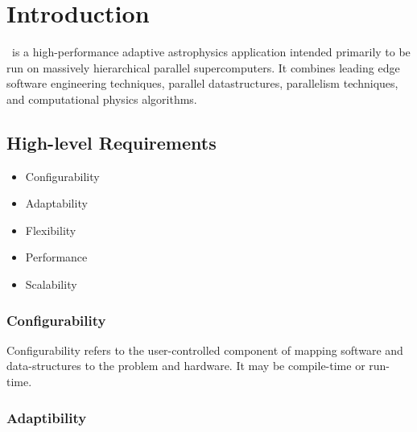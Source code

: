 \documentclass{article}
\begin{document}

\section{Introduction} \label{s:intro}

   \cello\ is a high-performance adaptive astrophysics application
   intended primarily to be run on massively hierarchical parallel
   supercomputers.  It combines leading edge software engineering
   techniques, parallel datastructures, parallelism techniques, and
   computational physics algorithms.

\subsection{High-level Requirements}

\begin{itemize}
\item Configurability
\item Adaptability
\item Flexibility
\item Performance
\item Scalability
\end{itemize}


\subsubsection{Configurability}

   Configurability refers to the user-controlled component of
   mapping software and data-structures to the problem and hardware.
   It may be compile-time or run-time.

\subsubsection{Adaptibility}
\end{document}
